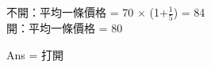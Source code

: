\documentclass{article}
\begin{document}
\fontsize{15pt}{20pt}\selectfont

\begin{CJK}{UTF8}{bsmi} %
\noindent
不開：平均一條價格 = 70 $\times$ (1+$\frac{1}{5}$) = 84\\
開：平均一條價格 = 80

Ans = 打開
\end{CJK} %
\end{document}
